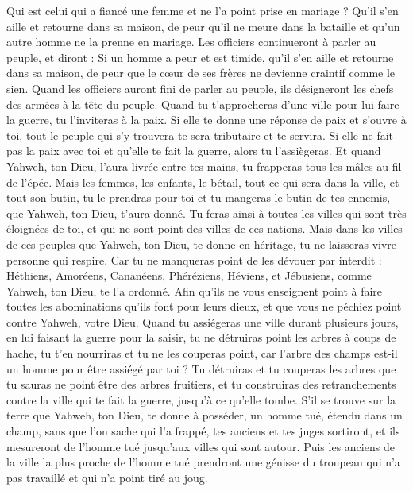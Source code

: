 \begin{multicols}{2}
Qui est celui qui a fiancé une femme et ne l'a point prise en mariage ? Qu'il s'en aille et retourne dans sa maison, de peur qu'il ne meure dans la bataille et qu'un autre homme ne la prenne en mariage.
Les officiers continueront à parler au peuple, et diront : Si un homme a peur et est timide, qu'il s'en aille et retourne dans sa maison, de peur que le cœur de ses frères ne devienne craintif comme le sien.
Quand les officiers auront fini de parler au peuple, ils désigneront les chefs des armées à la tête du peuple.
Quand tu t'approcheras d'une ville pour lui faire la guerre, tu l'inviteras à la paix.
Si elle te donne une réponse de paix et s'ouvre à toi, tout le peuple qui s'y trouvera te sera tributaire et te servira.
Si elle ne fait pas la paix avec toi et qu'elle te fait la guerre, alors tu l'assiègeras.
Et quand Yahweh, ton Dieu, l'aura livrée entre tes mains, tu frapperas tous les mâles au fil de l'épée.
Mais les femmes, les enfants, le bétail, tout ce qui sera dans la ville, et tout son butin, tu le prendras pour toi et tu mangeras le butin de tes ennemis, que Yahweh, ton Dieu, t'aura donné.
Tu feras ainsi à toutes les villes qui sont très éloignées de toi, et qui ne sont point des villes de ces nations.
Mais dans les villes de ces peuples que Yahweh, ton Dieu, te donne en héritage, tu ne laisseras vivre personne qui respire.
Car tu ne manqueras point de les dévouer par interdit : Héthiens, Amoréens, Cananéens, Phéréziens, Héviens, et Jébusiens, comme Yahweh, ton Dieu, te l'a ordonné.
Afin qu'ils ne vous enseignent point à faire toutes les abominations qu'ils font pour leurs dieux, et que vous ne péchiez point contre Yahweh, votre Dieu.
Quand tu assiégeras une ville durant plusieurs jours, en lui faisant la guerre pour la saisir, tu ne détruiras point les arbres à coups de hache, tu t'en nourriras et tu ne les couperas point, car l'arbre des champs est-il un homme pour être assiégé par toi ?
Tu détruiras et tu couperas les arbres que tu sauras ne point être des arbres fruitiers, et tu construiras des retranchements contre la ville qui te fait la guerre, jusqu'à ce qu'elle tombe.
\VerseOne{}S'il se trouve sur la terre que Yahweh, ton Dieu, te donne à posséder, un homme tué, étendu dans un champ, sans que l'on sache qui l'a frappé,
tes anciens et tes juges sortiront, et ils mesureront de l'homme tué jusqu'aux villes qui sont autour.
Puis les anciens de la ville la plus proche de l'homme tué prendront une génisse du troupeau qui n'a pas travaillé et qui n'a point tiré au joug.

\end{multicols}
